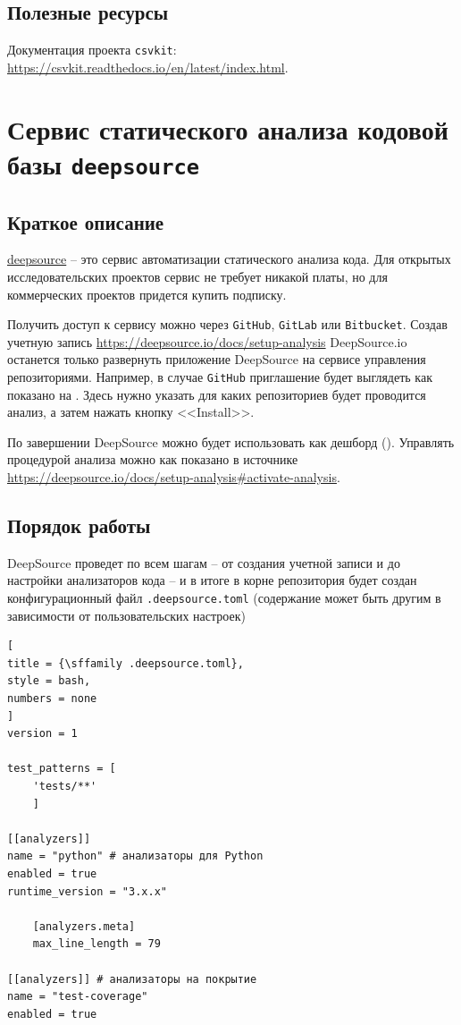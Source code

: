 \documentclass[%
	11pt,
	a4paper,
	utf8,
		]{article}
\begin{document}
\subsection{Полезные ресурсы}

Документация проекта \texttt{csvkit}: \url{https://csvkit.readthedocs.io/en/latest/index.html}.

\section{Сервис статического анализа кодовой базы \texttt{deepsource}}

\subsection{Краткое описание}

\href{https://deepsource.io/}{\ttfamily deepsource} -- это сервис автоматизации статического анализа кода. Для открытых исследовательских проектов сервис не требует никакой платы, но для коммерческих проектов придется купить подписку.

Получить доступ к сервису можно через \texttt{GitHub}, \texttt{GitLab} или \texttt{Bitbucket}. Создав учетную запись \url{https://deepsource.io/docs/setup-analysis} DeepSource.io останется только развернуть приложение DeepSource на сервисе управления репозиториями. Например, в случае \texttt{GitHub} приглашение будет выглядеть как показано на . Здесь нужно указать для каких репозиториев будет проводится анализ, а затем нажать кнопку <<Install>>. 

По завершении DeepSource можно будет использовать как дешборд (). Управлять процедурой анализа можно как показано в источнике \url{https://deepsource.io/docs/setup-analysis#activate-analysis}.

\subsection{Порядок работы}

DeepSource проведет по всем шагам -- от создания учетной записи и до настройки анализаторов кода -- и в итоге в корне репозитория будет создан конфигурационный файл \texttt{.deepsource.toml} (содержание может быть другим в зависимости от пользовательских настроек)
\begin{lstlisting}[
title = {\sffamily .deepsource.toml},
style = bash,
numbers = none
]
version = 1
	
test_patterns = [
	'tests/**'
	]
	
[[analyzers]]
name = "python" # анализаторы для Python
enabled = true
runtime_version = "3.x.x"
	
	[analyzers.meta]
	max_line_length = 79
	
[[analyzers]] # анализаторы на покрытие
name = "test-coverage"
enabled = true
\end{lstlisting}
\end{document}
